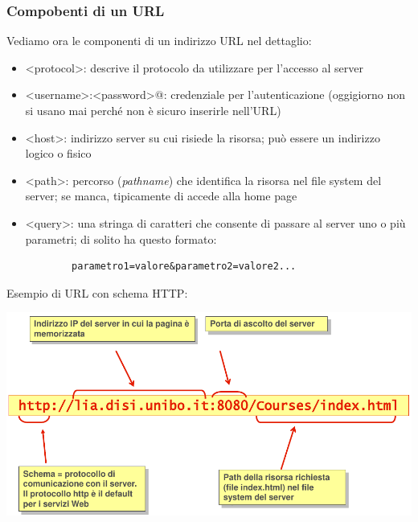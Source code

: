 \documentclass{article}
\begin{document}
\subsubsection{Compobenti di un URL}
Vediamo ora le componenti di un indirizzo URL nel dettaglio:
\begin{itemize}
    \item {\selectfont <protocol>}: descrive il protocolo da utilizzare per l'accesso al server
    \item {\selectfont <username>:<password>@}: credenziale per l'autenticazione (oggigiorno non si usano mai perché non è sicuro inserirle nell'URL)
    \item {\selectfont <host>}: indirizzo server su cui risiede la risorsa; può essere un indirizzo logico o fisico
    \item {\selectfont <path>}: percorso (\textit{pathname}) che identifica la risorsa nel file system del server; se manca, tipicamente di accede alla home page 
    \item {\selectfont <query>}: una stringa di caratteri che consente di passare al server uno o più parametri; di solito ha questo formato:
    \begin{verbatim}
        parametro1=valore&parametro2=valore2...
    \end{verbatim}
\end{itemize}
Esempio di URL con schema HTTP:
\begin{center}
    \includegraphics[scale=0.27]{Images/Es_URL.png}
\end{center}
\end{document}
